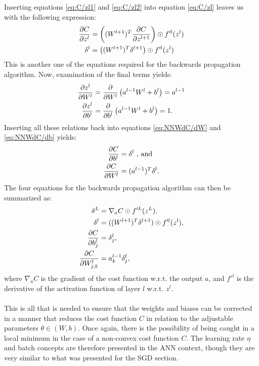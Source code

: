             Inserting equations \ref{eq:C/zl1} and \ref{eq:C/zl2} into equation \ref{eq:C/zl} leaves us with the following expression:
            \begin{align}
                \pdv{C}{z^l} &= \left( (W^{l+1})^T \pdv{C}{z^{l+1}}  \right) \odot f'^l(z^l)\\
                \delta^l &= \left( (W^{l+1})^T \delta^{l+1}  \right) \odot f'^l(z^l)
            \end{align}
            This is another one of the equations required for the backwards propagation algorithm. Now, examination of the final terms yields:
            \begin{align}
                \pdv{z^l}{W^l} &= \pdv{}{W^l}\left( a^{l-1}W^l + b^l \right) = a^{l-1}\\
                \pdv{z^l}{b^l} &= \pdv{}{b^l}\left( a^{l-1}W^l + b^l \right) = 1.
            \end{align}
            Inserting all these relations back into equations \ref{eq:NNWdC/dW} and \ref{eq:NNWdC/db} yields:
            \begin{align}
                \pdv{C}{b^l} &= \delta^l \ \text{,  and}\\
                \pdv{C}{W^l} &= (a^{l-1})^T\delta^l.
            \end{align}
            The four equations for the backwards propagation algorithm can then be summarized as:%
            \begin{align}
                \delta^L &= \nabla_a C \odot f'^L(z^L), \\
                \delta^l &= ((W^{l+1})^T\delta^{l+1})\odot f'^l(z^l), \\
                \pdv{C}{b^l_j} &= \delta^l_j, \\
                \pdv{C}{W^l_{j,k}} &= a^{l-1}_k\delta^l_j,
            \end{align}
            where $\nabla_aC$ is the gradient of the cost function w.r.t. the output $a$, and $f'^l$ is the derivative of the activation function of layer $l$ w.r.t. $z^l$. \\\\
            This is all that is needed to ensure that the weights and biases can be corrected in a manner that reduces the cost function $C$ in relation to the adjustable parameters $\theta \in \left(W,b\right)$. Once again, there is the possibility of being caught in a local minimum in the case of a non-convex cost function $C$. The learning rate $\eta$ and batch concepts are therefore presented in the ANN context, though they are very similar to what was presented for the SGD section.
            
